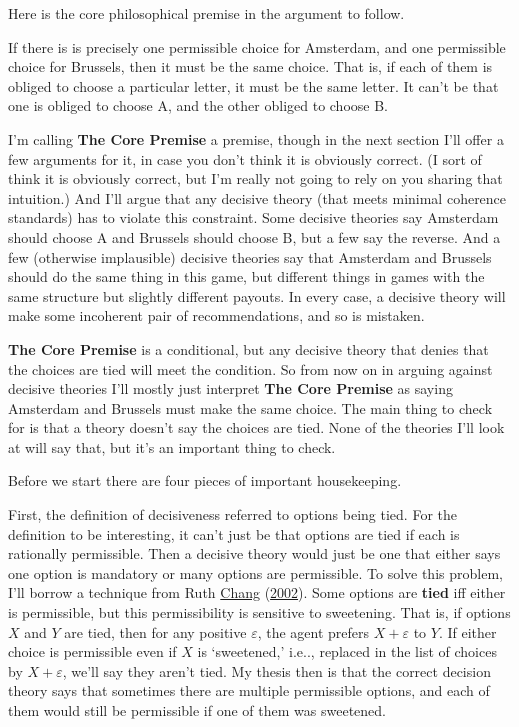 \documentclass[
  12pt,
]{article}
\providecommand{\tightlist}{%
  \setlength{\itemsep}{0pt}\setlength{\parskip}{0pt}}
\begin{document}
Here is the core philosophical premise in the argument to follow.

\begin{description}
\tightlist
\item[The Core Premise]
If there is is precisely one permissible choice for Amsterdam, and one
permissible choice for Brussels, then it must be the same choice. That
is, if each of them is obliged to choose a particular letter, it must be
the same letter. It can't be that one is obliged to choose A, and the
other obliged to choose B.
\end{description}

I'm calling \textbf{The Core Premise} a premise, though in the next
section I'll offer a few arguments for it, in case you don't think it is
obviously correct. (I sort of think it is obviously correct, but I'm
really not going to rely on you sharing that intuition.) And I'll argue
that any decisive theory (that meets minimal coherence standards) has to
violate this constraint. Some decisive theories say Amsterdam should
choose A and Brussels should choose B, but a few say the reverse. And a
few (otherwise implausible) decisive theories say that Amsterdam and
Brussels should do the same thing in this game, but different things in
games with the same structure but slightly different payouts. In every
case, a decisive theory will make some incoherent pair of
recommendations, and so is mistaken.

\textbf{The Core Premise} is a conditional, but any decisive theory that
denies that the choices are tied will meet the condition. So from now on
in arguing against decisive theories I'll mostly just interpret
\textbf{The Core Premise} as saying Amsterdam and Brussels must make the
same choice. The main thing to check for is that a theory doesn't say
the choices are tied. None of the theories I'll look at will say that,
but it's an important thing to check.

Before we start there are four pieces of important housekeeping.

First, the definition of decisiveness referred to options being tied.
For the definition to be interesting, it can't just be that options are
tied if each is rationally permissible. Then a decisive theory would
just be one that either says one option is mandatory or many options are
permissible. To solve this problem, I'll borrow a technique from Ruth
\protect\hyperlink{ref-Chang2002}{Chang}
(\protect\hyperlink{ref-Chang2002}{2002}). Some options are
\textbf{tied} iff either is permissible, but this permissibility is
sensitive to sweetening. That is, if options \(X\) and \(Y\) are tied,
then for any positive \(\varepsilon\), the agent prefers
\(X + \varepsilon\) to \(Y\). If either choice is permissible even if
\(X\) is `sweetened,' i.e.., replaced in the list of choices by
\(X + \varepsilon\), we'll say they aren't tied. My thesis then is that
the correct decision theory says that sometimes there are multiple
permissible options, and each of them would still be permissible if one
of them was sweetened.
\end{document}

